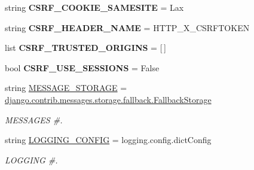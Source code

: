 \begin{DoxyCompactItemize}
string {\bfseries C\+S\+R\+F\+\_\+\+C\+O\+O\+K\+I\+E\+\_\+\+S\+A\+M\+E\+S\+I\+TE} = \textquotesingle{}Lax\textquotesingle{}
\item 
\mbox{\label{namespacedjango_1_1conf_1_1global__settings_a48a8c906c767797b7a34f7777896e6d5}} 
string {\bfseries C\+S\+R\+F\+\_\+\+H\+E\+A\+D\+E\+R\+\_\+\+N\+A\+ME} = \textquotesingle{}H\+T\+T\+P\+\_\+\+X\+\_\+\+C\+S\+R\+F\+T\+O\+K\+EN\textquotesingle{}
\item 
\mbox{\label{namespacedjango_1_1conf_1_1global__settings_af86935657925a37a4c30f5ec04973eb4}} 
list {\bfseries C\+S\+R\+F\+\_\+\+T\+R\+U\+S\+T\+E\+D\+\_\+\+O\+R\+I\+G\+I\+NS} = \mbox{[}$\,$\mbox{]}
\item 
\mbox{\label{namespacedjango_1_1conf_1_1global__settings_a8d6f1e9601ede97b89a0a9ba4f425255}} 
bool {\bfseries C\+S\+R\+F\+\_\+\+U\+S\+E\+\_\+\+S\+E\+S\+S\+I\+O\+NS} = False
\item 
\mbox{\label{namespacedjango_1_1conf_1_1global__settings_abe837677a70466d48fd96b9cd19b4a0e}} 
string \mbox{\hyperlink{namespacedjango_1_1conf_1_1global__settings_abe837677a70466d48fd96b9cd19b4a0e}{M\+E\+S\+S\+A\+G\+E\+\_\+\+S\+T\+O\+R\+A\+GE}} = \textquotesingle{}\mbox{\hyperlink{classdjango_1_1contrib_1_1messages_1_1storage_1_1fallback_1_1_fallback_storage}{django.\+contrib.\+messages.\+storage.\+fallback.\+Fallback\+Storage}}\textquotesingle{}
\begin{DoxyCompactList}\small\item\em M\+E\+S\+S\+A\+G\+ES \#. \end{DoxyCompactList}\item 
\mbox{\label{namespacedjango_1_1conf_1_1global__settings_ae1fc48f4438916495f95050e3047be6a}} 
string \mbox{\hyperlink{namespacedjango_1_1conf_1_1global__settings_ae1fc48f4438916495f95050e3047be6a}{L\+O\+G\+G\+I\+N\+G\+\_\+\+C\+O\+N\+F\+IG}} = \textquotesingle{}logging.\+config.\+dict\+Config\textquotesingle{}
\begin{DoxyCompactList}\small\item\em L\+O\+G\+G\+I\+NG \#. \end{DoxyCompactList}\item 

\end{DoxyCompactItemize}
